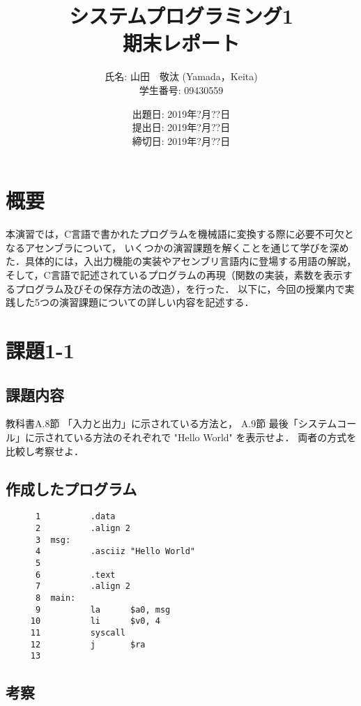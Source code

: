\documentclass[a4j,11pt]{jarticle}
\title{システムプログラミング1 \\
       期末レポート}
\author{氏名: 山田　敬汰 (Yamada，Keita) \\
        学生番号: 09430559}
\date{出題日: 2019年?月??日 \\   %
      提出日: 2019年?月??日 \\
      締切日: 2019年?月??日 \\}  %
\begin{document}
\maketitle



\section{概要}

本演習では，C言語で書かれたプログラムを機械語に変換する際に必要不可欠となるアセンブラについて，
いくつかの演習課題を解くことを通じて学びを深めた．具体的には，入出力機能の実装やアセンブリ言語内に登場する用語の解説，
そして，C言語で記述されているプログラムの再現（関数の実装，素数を表示するプログラム及びその保存方法の改造），を行った．
以下に，今回の授業内で実践した5つの演習課題についての詳しい内容を記述する．

\section{課題1-1}

\subsection{課題内容}
教科書A.8節 「入力と出力」に示されている方法と， 
A.9節 最後「システムコール」に示されている方法のそれぞれで "Hello World" を表示せよ．
両者の方式を比較し考察せよ．

\subsection{作成したプログラム}

\begin{verbatim}
      1          .data
      2          .align 2
      3  msg:
      4          .asciiz "Hello World"
      5
      6          .text
      7          .align 2
      8  main:
      9          la      $a0, msg
     10          li      $v0, 4
     11          syscall
     12          j       $ra
     13          
\end{verbatim}

\subsection{考察}
\end{document}
